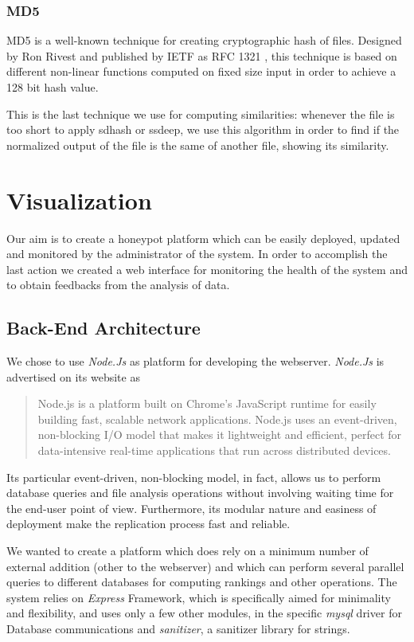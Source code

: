 \subsubsection{MD5}
MD5 is a well-known technique for creating cryptographic hash of files. Designed by Ron Rivest and published by IETF as RFC 1321 \cite{md5}, this technique is based on different non-linear functions computed on fixed size input in order to achieve a 128 bit hash value.

This is the last technique we use for computing similarities: whenever the file is too short to apply sdhash or ssdeep, we use this algorithm in order to find if the normalized output of the file is the same of another file, showing its similarity.

\section{Visualization}

Our aim is to create a honeypot platform which can be easily deployed, updated and monitored by the administrator of the system. In order to accomplish the last action we created a web interface for monitoring the health of the system and to obtain feedbacks from the analysis of data.

\subsection{Back-End Architecture}

We chose to use \emph{Node.Js} as platform for developing the webserver. \emph{Node.Js} is advertised on its website \cite{node_home} as
\begin{quotation}
Node.js is a platform built on Chrome's JavaScript runtime for easily building fast, scalable network applications. Node.js uses an event-driven, non-blocking I/O model that makes it lightweight and efficient, perfect for data-intensive real-time applications that run across distributed devices.
\end{quotation}

Its particular event-driven, non-blocking model, in fact, allows us to perform database queries and file analysis operations without involving waiting time for the end-user point of view. Furthermore, its modular nature and easiness of deployment make the replication process fast and reliable.

We wanted to create a platform which does rely on a minimum number of external addition (other to the webserver) and which can perform several parallel queries to different databases for computing rankings and other operations. The system relies on \emph{Express} \cite{express_node} Framework, which is specifically aimed for minimality and flexibility, and uses only a few other modules, in the specific \emph{mysql} driver for Database communications and \emph{sanitizer}, a sanitizer library for strings.


